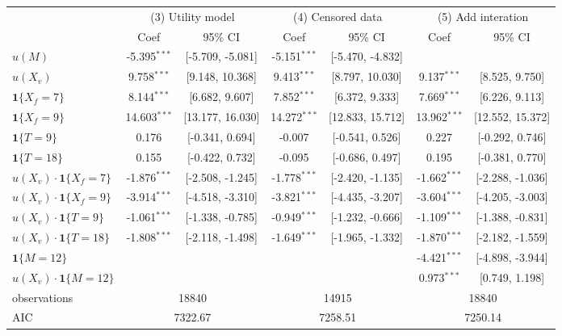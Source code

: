 \begin{tabular}{lcccccc}
  \hline
   & \multicolumn{2}{c}{(3) Utility model} & \multicolumn{2}{c}{(4) Censored data} & \multicolumn{2}{c}{(5) Add interation} \\ & Coef & 95\% CI & Coef & 95\% CI & Coef & 95\% CI \\ \hline
$u(M)$ & -5.395$^{***}$ & [-5.709, -5.081] & -5.151$^{***}$ & [-5.470, -4.832] &  &  \\ 
  $u(X_v)$ & 9.758$^{***}$ & [9.148, 10.368] & 9.413$^{***}$ & [8.797, 10.030] & 9.137$^{***}$ & [8.525, 9.750] \\ 
  $\textbf{1}\{X_f = 7\}$ & 8.144$^{***}$ & [6.682, 9.607] & 7.852$^{***}$ & [6.372, 9.333] & 7.669$^{***}$ & [6.226, 9.113] \\ 
  $\textbf{1}\{X_f = 9\}$ & 14.603$^{***}$ & [13.177, 16.030] & 14.272$^{***}$ & [12.833, 15.712] & 13.962$^{***}$ & [12.552, 15.372] \\ 
  $\textbf{1}\{T = 9\}$ & 0.176 & [-0.341, 0.694] & -0.007 & [-0.541, 0.526] & 0.227 & [-0.292, 0.746] \\ 
  $\textbf{1}\{T = 18\}$ & 0.155 & [-0.422, 0.732] & -0.095 & [-0.686, 0.497] & 0.195 & [-0.381, 0.770] \\ 
  $u(X_v)\cdot\textbf{1}\{X_f = 7\}$ & -1.876$^{***}$ & [-2.508, -1.245] & -1.778$^{***}$ & [-2.420, -1.135] & -1.662$^{***}$ & [-2.288, -1.036] \\ 
  $u(X_v)\cdot\textbf{1}\{X_f = 9\}$ & -3.914$^{***}$ & [-4.518, -3.310] & -3.821$^{***}$ & [-4.435, -3.207] & -3.604$^{***}$ & [-4.205, -3.003] \\ 
  $u(X_v)\cdot\textbf{1}\{T = 9\}$ & -1.061$^{***}$ & [-1.338, -0.785] & -0.949$^{***}$ & [-1.232, -0.666] & -1.109$^{***}$ & [-1.388, -0.831] \\ 
  $u(X_v)\cdot\textbf{1}\{T = 18\}$ & -1.808$^{***}$ & [-2.118, -1.498] & -1.649$^{***}$ & [-1.965, -1.332] & -1.870$^{***}$ & [-2.182, -1.559] \\ 
  $\textbf{1}\{M = 12\}$ &  &  &  &  & -4.421$^{***}$ & [-4.898, -3.944] \\ 
  $u(X_v)\cdot\textbf{1}\{M = 12\}$ &  &  &  &  & 0.973$^{***}$ & [0.749, 1.198] \\ 
   \hline observations & \multicolumn{2}{c}{18840} & \multicolumn{2}{c}{14915} & \multicolumn{2}{c}{18840} \\ AIC & \multicolumn{2}{c}{7322.67} & \multicolumn{2}{c}{7258.51} & \multicolumn{2}{c}{7250.14} \\ \hline
\end{tabular}

